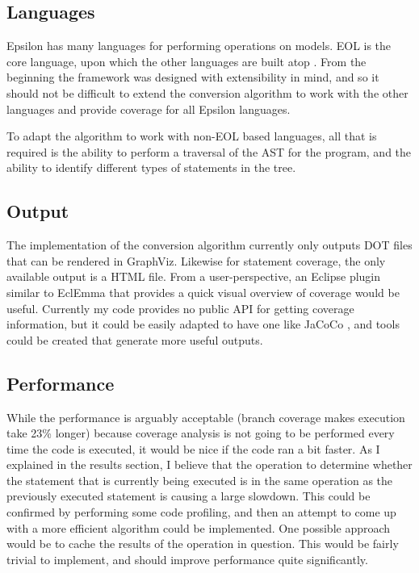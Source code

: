 \subsection{Languages}

Epsilon has many languages for performing operations on models. EOL is the core language, upon which the other languages are built atop \citep{epsilonBook}. From the beginning the framework was designed with extensibility in mind, and so it should not be difficult to extend the conversion algorithm to work with the other languages and provide coverage for all Epsilon languages.

To adapt the algorithm to work with non-EOL based languages, all that is required is the ability to perform a traversal of the AST for the program, and the ability to identify different types of statements in the tree.

\subsection{Output}
The implementation of the conversion algorithm currently only outputs DOT files that can be rendered in GraphViz. Likewise for statement coverage, the only available output is a HTML file. From a user-perspective, an Eclipse plugin similar to EclEmma that provides a quick visual overview of coverage would be useful. Currently my code provides no public API for getting coverage information, but it could be easily adapted to have one like JaCoCo \citep{JaCoCo}, and tools could be created that generate more useful outputs.


\subsection{Performance}

While the performance is arguably acceptable (branch coverage makes execution take 23\% longer) because coverage analysis is not going to be performed every time the code is executed, it would be nice if the code ran a bit faster. As I explained in the results section, I believe that the operation to determine whether the statement that is currently being executed is in the same operation as the previously executed statement is causing a large slowdown. This could be confirmed by performing some code profiling, and then an attempt to come up with a more efficient algorithm could be implemented. One possible approach would be to cache the results of the operation in question. This would be fairly trivial to implement, and should improve performance quite significantly. %

